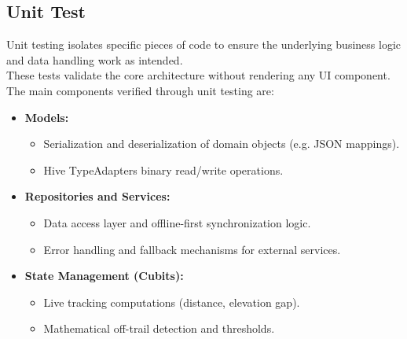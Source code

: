 \documentclass[12pt]{article}
\begin{document}
\subsection{Unit Test}
Unit testing isolates specific pieces of code to ensure the underlying business logic and data handling work as intended. \\
These tests validate the core architecture without rendering any UI component. \\
The main components verified through unit testing are:
\begin{itemize}
    \item \textbf{Models:} 
        \begin{itemize}
            \item Serialization and deserialization of domain objects (e.g. JSON mappings).
            \item Hive TypeAdapters binary read/write operations.
        \end{itemize}
    \item \textbf{Repositories and Services:} 
        \begin{itemize}
            \item Data access layer and offline-first synchronization logic.
            \item Error handling and fallback mechanisms for external services.
        \end{itemize}
    \item \textbf{State Management (Cubits):} 
        \begin{itemize}
            \item Live tracking computations (distance, elevation gap).
            \item Mathematical off-trail detection and thresholds.
        \end{itemize}
\end{itemize}
\end{document}
